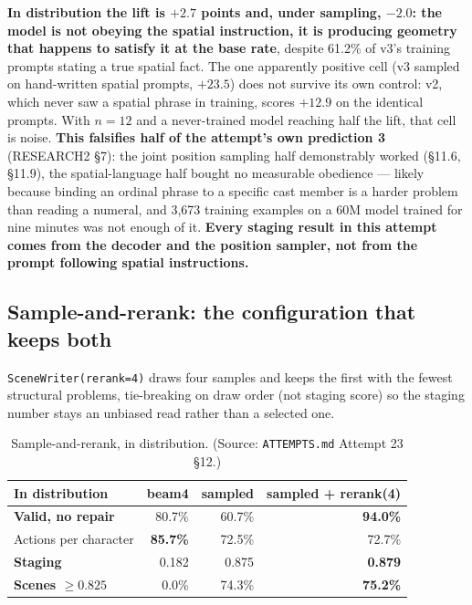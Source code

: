 \documentclass[11pt]{article}
\newcommand{\secsym}{\S}
\begin{document}
\textbf{In distribution the lift is $+2.7$ points and, under sampling,
$-2.0$: the model is not obeying the spatial instruction, it is producing
geometry that happens to satisfy it at the base rate}, despite 61.2\% of
v3's training prompts stating a true spatial fact. The one apparently
positive cell (v3 sampled on hand-written spatial prompts, $+23.5$) does
not survive its own control: v2, which never saw a spatial phrase in
training, scores $+12.9$ on the identical prompts. With $n=12$ and a
never-trained model reaching half the lift, that cell is noise.
\textbf{This falsifies half of the attempt's own prediction 3}
(RESEARCH2 \secsym7): the joint position sampling half demonstrably
worked (\secsym11.6, \secsym11.9), the spatial-language half bought no
measurable obedience --- likely because binding an ordinal phrase to a
specific cast member is a harder problem than reading a numeral, and
3,673 training examples on a 60M model trained for nine minutes was not
enough of it. \textbf{Every staging result in this attempt comes from
the decoder and the position sampler, not from the prompt following
spatial instructions.}

\subsection{Sample-and-rerank: the configuration that keeps both}
\label{sec:samplerank}

\texttt{SceneWriter(rerank=4)} draws four samples and keeps the first
with the fewest structural problems, tie-breaking on draw order (not
staging score) so the staging number stays an unbiased read rather than a
selected one.

\begin{table}[h]
\centering
\caption{Sample-and-rerank, in distribution.
(Source: \texttt{ATTEMPTS.md} Attempt 23 \secsym12.)}
\label{tab:samplerankindist}
\begin{tabular}{@{}L{5cm}rrr@{}}
\toprule
In distribution & beam4 & sampled & sampled + rerank(4) \\
\midrule
\textbf{Valid, no repair} & 80.7\% & 60.7\% & \textbf{94.0\%} \\
Actions per character & \textbf{85.7\%} & 72.5\% & 72.7\% \\
\textbf{Staging} & 0.182 & 0.875 & \textbf{0.879} \\
\textbf{Scenes $\geq0.825$} & 0.0\% & 74.3\% & \textbf{75.2\%} \\
\bottomrule
\end{tabular}
\end{table}
\end{document}
